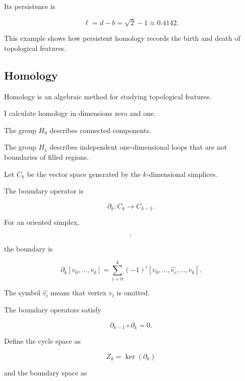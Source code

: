 \documentclass[oneside,english,11pt]{article}
\renewcommand{\boxed}[1]{#1}
\begin{document}
Its persistence is

\begin{equation}
\ell=d-b=\sqrt{2}-1\approx0.4142.
\end{equation}

This example shows how persistent
homology records the birth and death
of topological features.

\subsection{Homology}

Homology is an algebraic method for studying
topological features.

I calculate homology in dimensions zero and one.

The group $H_0$ describes connected components.

The group $H_1$ describes independent one-dimensional
loops that are not boundaries of filled regions.

Let $C_k$ be the vector space generated by
the $k$-dimensional simplices.

The boundary operator is

\begin{equation}
\partial_k:C_k\longrightarrow C_{k-1}.
\end{equation}

For an oriented simplex,

\begin{equation}
[v_0,v_1,\ldots,v_k],
\end{equation}

the boundary is

\begin{equation}
\boxed{
\partial_k[v_0,\ldots,v_k]
=
\sum_{i=0}^{k}
(-1)^i
[v_0,\ldots,\widehat{v_i},\ldots,v_k].
}
\end{equation}

The symbol $\widehat{v_i}$ means that vertex $v_i$
is omitted.

The boundary operators satisfy

\begin{equation}
\boxed{
\partial_{k-1}\circ\partial_k=0.
}
\end{equation}

Define the cycle space as

\begin{equation}
Z_k=\ker(\partial_k)
\end{equation}

and the boundary space as
\end{document}
